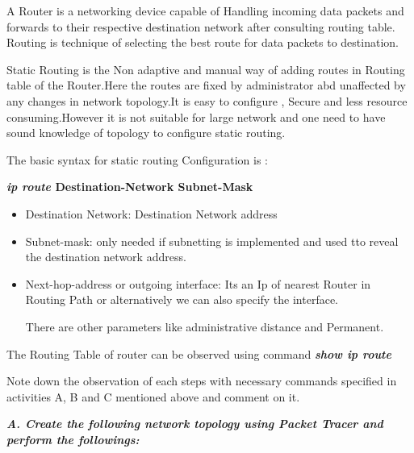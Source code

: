 \documentclass[a4paper,11pt]{article}
\begin{document}
\begin{A}
      {
            A Router is a networking device capable of Handling incoming data packets and forwards to their respective destination network after consulting routing table.
            Routing is technique of selecting the best route for data packets to destination.

            Static Routing is the Non adaptive and manual way of adding routes in Routing table of the Router.Here the routes are fixed by administrator abd unaffected by any changes in network topology.It is easy to configure , Secure and less resource consuming.However it is not suitable for large network and one need to have sound knowledge of topology to configure static routing.


            The basic syntax for static routing Configuration is :
            \begin{center}
                  {\bfseries \textit {ip route}  \quad Destination-Network \quad  Subnet-Mask   }
            \end{center}

            \begin{itemize}
                  \item Destination Network: Destination Network address
                  \item Subnet-mask: only needed if subnetting is implemented and used tto reveal the destination network address.
                  \item Next-hop-address or outgoing interface: Its an Ip of nearest Router in Routing Path or alternatively we can also specify the interface.

                        There are other parameters like administrative distance and Permanent.
            \end{itemize}
      }
      The Routing Table of router can be observed using command {\bfseries \textit{show ip route} }

\end{A}

\begin{Q}
      {
            Note down the observation of each steps with necessary commands specified in activities A, B and C mentioned above and comment on it.\\
      }
\end{Q}


{\bfseries \textit{A. Create the following network topology using Packet Tracer and perform the followings:}}
\end{document}

